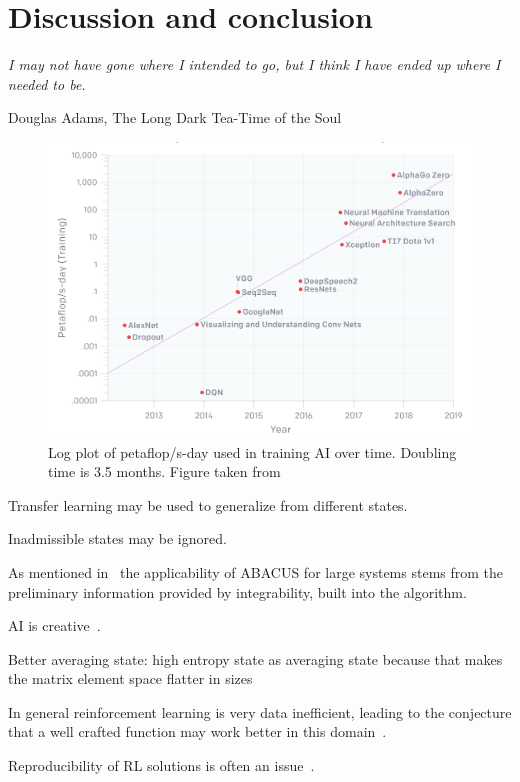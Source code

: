 \documentclass[11pt, a4paper]{report} %
\begin{document}
\chapter{Discussion and conclusion}\label{chap:conclusion}

\epigraph{\textit{I may not have gone where I intended to go, but I think I have ended up where I needed to be.}}{Douglas Adams, The Long Dark Tea-Time of the Soul}


\begin{figure}[tb!]
  \centering
  \includegraphics[width=\textwidth]{increaseaiflops.png}
  \caption{Log plot of petaflop/s-day used in training AI over time. Doubling time is 3.5 months. Figure taken from~\cite{amodei2018}}
\end{figure}

Transfer learning may be used to generalize from different states.

Inadmissible states may be ignored.

As mentioned in~\cite{Caux2009} the applicability of ABACUS for large systems stems from the preliminary information provided by integrability, built into the algorithm.

AI is creative~\cite{1803.03453}.

Better averaging state: high entropy state as averaging state because that makes the matrix element space flatter in sizes

In general reinforcement learning is very data inefficient, leading to the conjecture that a well crafted function may work better in this domain~\cite{1710.02298}.

Reproducibility of RL solutions is often an issue~\cite{1709.06560}.
\end{document}
